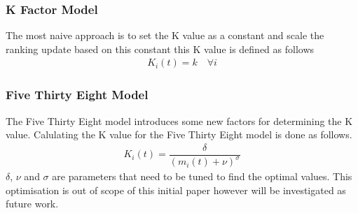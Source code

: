 \documentclass[12pt,a4paper]{article}
\begin{document}
\subsubsection{K Factor Model}
The most naive approach is to set the K value as a constant and scale the ranking
update based on this constant this K value is defined as follows
\begin{gather}
  K_i(t) = k \quad \forall i
\end{gather}
\subsubsection{Five Thirty Eight Model}
The Five Thirty Eight model introduces some new factors for determining the K
value. Calulating the K value for the Five Thirty Eight model is done as follows.
\begin{gather}
  K_i(t) = \dfrac{\delta}{{(m_i(t) + \nu)}^{\sigma}}
\end{gather}
$\delta$, $\nu$ and $\sigma$ are parameters that need to be tuned to find the
optimal values. This optimisation is out of scope of this initial paper however will be
investigated as future work.
\end{document}
